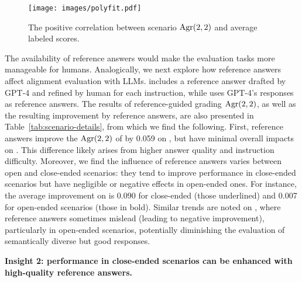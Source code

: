 \begin{figure}[t]
    \centering
    \texttt{[image: images/polyfit.pdf]}
    \caption{The positive correlation between scenario $\mbox{Agr}(2,2)$ and average labeled scores.}
    \label{fig:polyfit}
\end{figure}






\vspace{1ex}
The availability of reference answers would make the evaluation tasks more manageable for humans.
Analogically, we next explore how reference answers affect alignment evaluation with LLMs.
\aligndata includes a reference answer drafted by GPT-4 and refined by human for each instruction, while \syndata uses GPT-4’s responses as reference answers.
The results of reference-guided grading $\mbox{Agr}(2,2)$, as well as the resulting improvement by reference answers, are also presented in Table~\ref{tab:scenario-details}, from which we find the following.
First, reference answers improve the $\mbox{Agr}(2,2)$ of \modelname by 0.059 on \aligndata, but have minimal overall impacts on \syndata. This difference likely arises from  higher answer quality and instruction difficulty. Moreover, we find the influence of reference answers varies between open and close-ended scenarios: they tend to improve performance in close-ended scenarios but have negligible or negative effects in open-ended ones. For instance, the average improvement on \aligndata is 0.090 for close-ended (\ie those underlined) and 0.007 for open-ended scenarios (\ie those in bold). Similar trends are noted on \syndata, where reference answers sometimes mislead \modelname (\ie leading to negative improvement), particularly in open-ended scenarios, potentially diminishing the evaluation of semantically diverse but good responses.


\textbf{Insight 2:  performance in close-ended scenarios can be enhanced with high-quality reference answers.}








